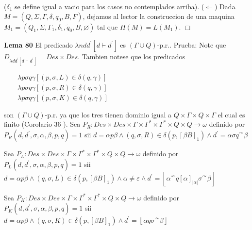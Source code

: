 (\(\delta _{1}\) se define igual a vacio para los casos no contemplados arriba).
(\(\Leftarrow \)) Dada \(M=(Q,\Sigma ,\Gamma ,\delta ,q_{0},B,F)\), dejamos al lector la construccion de una maquina \(M_{1}=(Q_{1},\Sigma ,\Gamma _{1},\delta _{1},\tilde{q}_{0},B,\varnothing )\) tal que \(H(M)=L(M_{1})\). \(\Box\)





\textbf{Lema 80} El predicado \(\lambda ndd^{\prime }\left[ d\vdash d^{\prime }\right] \) es \( (\Gamma \cup Q)\)-p.r..
Prueba: Note que \(D_{\lambda dd^{\prime }\left[ d\vdash d^{\prime }\right] }=Des\times Des\). Tambien notese que los predicados

\(\displaystyle \begin{array}{rcl} & & \lambda p\sigma q\gamma \left[ (p,\sigma ,L)\in \delta (q,\gamma )\right] \\ & & \lambda p\sigma q\gamma \left[ (p,\sigma ,R)\in \delta (q,\gamma )\right] \\ & & \lambda p\sigma q\gamma \left[ (p,\sigma ,K)\in \delta (q,\gamma )\right] \end{array} \)

son \((\Gamma \cup Q)\)-p.r. ya que los tres tienen dominio igual a \(Q\times \Gamma \times Q\times \Gamma \) el cual es finito (Corolario 36 ). Sea \(P_{R}:Des\times Des\times \Gamma \times \Gamma ^{\ast }\times \Gamma ^{\ast }\times Q\times Q\rightarrow \omega \) definido por \(P_{R}(d,d^{\prime },\sigma ,\alpha ,\beta ,p,q)=1\) sii
\(\displaystyle d=\alpha p\beta \wedge (q,\sigma ,R)\in \delta \left( p,\left[ \beta B\right] _{1}\right) \wedge d^{\prime }=\alpha \sigma q^{\curvearrowright }\beta \)

Sea \(P_{L}:Des\times Des\times \Gamma \times \Gamma ^{\ast }\times \Gamma ^{\ast }\times Q\times Q\rightarrow \omega \) definido por \(P_{L}(d,d^{\prime },\sigma ,\alpha ,\beta ,p,q)=1\) sii
\(\displaystyle d=\alpha p\beta \wedge (q,\sigma ,L)\in \delta \left( p,\left[ \beta B\right] _{1}\right) \wedge \alpha \neq \varepsilon \wedge d^{\prime }=\left\lfloor \alpha ^{\curvearrowleft }q\left[ \alpha \right] _{\left\vert \alpha \right\vert }\sigma ^{\curvearrowright }\beta \right\rfloor \)

Sea \(P_{K}:Des\times Des\times \Gamma \times \Gamma ^{\ast }\times \Gamma ^{\ast }\times Q\times Q\rightarrow \omega \) definido por \(P_{K}(d,d^{\prime },\sigma ,\alpha ,\beta ,p,q)=1\) sii
\(\displaystyle d=\alpha p\beta \wedge (q,\sigma ,K)\in \delta \left( p,\left[ \beta B\right] _{1}\right) \wedge d^{\prime }=\left\lfloor \alpha q\sigma ^{\curvearrowright }\beta \right\rfloor \)

